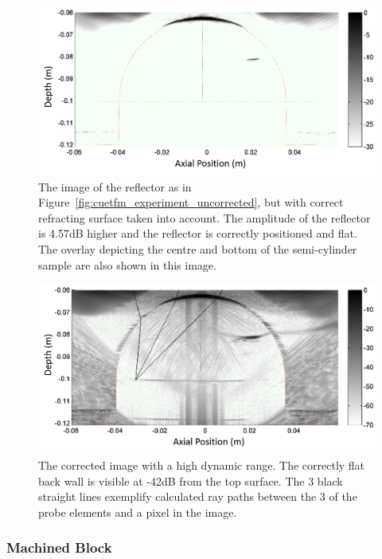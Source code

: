 \begin{figure}[htbp!]
\centering
		\includegraphics[width=\textwidth]{result-corrected.png}
		\caption{The image of the reflector as in Figure{~\ref{fig:cuetfm_experiment_uncorrected}}, but with correct refracting surface taken into account. The amplitude of the reflector is 4.57dB higher and the reflector is correctly positioned and flat. The overlay depicting the centre and bottom of the semi-cylinder sample are also shown in this image.}
		\label{fig:cuetfm_experiment_corrected}
\end{figure}

\begin{figure}[htbp!]
\centering
		\includegraphics[width=\textwidth]{result-highdr.png}
		\caption{The corrected image with a high dynamic range. The correctly flat back wall is visible at -42dB from the top surface. The 3 black straight lines exemplify calculated ray paths between the 3 of the probe elements and a pixel in the image.}
		\label{fig:res4}
\end{figure}
\clearpage
\subsubsection{Machined Block}\label{sec:ail_result}

